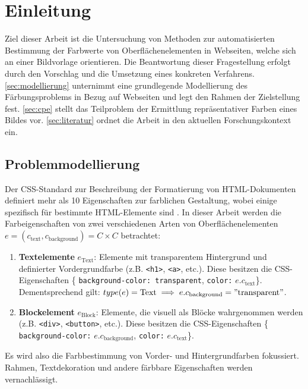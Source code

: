 \section{Einleitung}

Ziel dieser Arbeit ist die Untersuchung von Methoden zur automatisierten Bestimmung der Farbwerte von Oberflächenelementen in Webseiten, welche sich an einer Bildvorlage orientieren. Die Beantwortung dieser Fragestellung erfolgt durch den Vorschlag und die Umsetzung eines konkreten Verfahrens. \autoref{sec:modellierung} unternimmt eine grundlegende Modellierung des Färbungsproblems in Bezug auf Webseiten und legt  den Rahmen der Zielstellung fest. \autoref{sec:cpe} stellt das Teilproblem der Ermittlung repräsentativer Farben eines Bildes vor. \autoref{sec:literatur} ordnet die Arbeit in den aktuellen Forschungskontext ein.

\subsection{Problemmodellierung}
\label{sec:modellierung}

Der CSS-Standard zur Beschreibung der Formatierung von HTML-Dokumenten definiert mehr als 10 Eigenschaften zur farblichen Gestaltung, wobei einige spezifisch für bestimmte  HTML-Elemente sind  \citep{css3-color}. In dieser Arbeit werden die Farbeigenschaften von zwei verschiedenen Arten von Oberflächenelementen $e = (c_\text{text}, c_\text{background}) = C \times C$ betrachtet:
\begin{enumerate}
	\item \textbf{Textelemente} $e_\text{Text}$: Elemente mit transparentem Hintergrund und definierter Vordergrundfarbe (z.B. \texttt{<h1>}, \texttt{<a>}, etc.). Diese besitzen die CSS-Eigenschaften \{ \texttt{background-color: transparent}, \texttt{color:} $e.c_\text{text}$\}.\\ Dementsprechend gilt: $type(e) = \text{Text} \implies e.c_\text{background} = "\text{transparent}"$.\\
	\item  \textbf{Blockelement} $e_\text{Block}$: Elemente, die visuell als Blöcke wahrgenommen werden (z.B. \texttt{<div>}, \texttt{<button>}, etc.). Diese besitzen die CSS-Eigenschaften \{ \texttt{background-color:} $e.c_\text{background}$, \texttt{color:} $e.c_\text{text}$\}.
\end{enumerate}
Es wird also die Farbbestimmung von Vorder- und Hintergrundfarben fokussiert. Rahmen, Textdekoration und andere färbbare Eigenschaften werden vernachlässigt.

